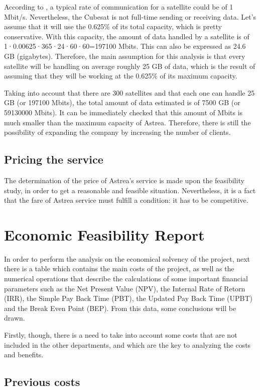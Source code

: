 According to \cite{GomSpace2016}, a typical rate of communication for a satellite could be of 1 Mbit/s. Nevertheless, the Cubesat is not full-time sending or receiving data. Let's assume that it will use the 0.625\% of its total capacity, which is pretty conservative. With this capacity, the amount of data handled by a satellite is of 1·0.00625·365·24·60·60=197100 Mbits. This can also be expressed as 24.6 GB (gigabytes). Therefore, the main assumption for this analysis is that every satellite will be handling on average roughly 25 GB of data, which is the result of assuming that they will be working at the 0.625\% of its maximum capacity. 

Taking into account that there are 300 satellites and that each one can handle 25 GB (or 197100 Mbits), the total amount of data estimated is of 7500 GB (or 59130000 Mbits). It can be immediately checked that this amount of Mbits is much smaller than the maximum capacity of Astrea. Therefore, there is still the possibility of expanding the company by increasing the number of clients.  

\subsection{Pricing the service}
The determination of the price of Astrea's service is made upon the feasibility study, in order to get a reasonable and feasible situation. Nevertheless, it is a fact that the fare of Astrea service must fulfill a condition: it has to be competitive. 

\section{Economic Feasibility Report}

In order to perform the analysis on the economical solvency of the project, next there is a table which contains the main costs of the project, as well as the numerical operations that describe the calculations of some important financial parameters such as the Net Present Value (NPV), the Internal Rate of Retorn (IRR), the Simple Pay Back Time (PBT), the Updated Pay Back Time (UPBT) and the Break Even Point (BEP). From this data, some conclusions will be drawn.

Firstly, though, there is a need to take into account some costs that are not included in the other departments, and which are the key to analyzing the costs and benefits. 

\newpage
\subsection{Previous costs}
